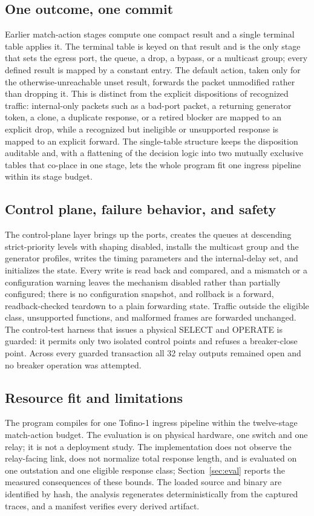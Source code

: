 \documentclass[conference]{IEEEtran}
\begin{document}
\subsection{One outcome, one commit}
Earlier match-action stages compute one compact result and a single terminal table applies it. The
terminal table is keyed on that result and is the only stage that sets the egress port, the queue, a
drop, a bypass, or a multicast group; every defined result is mapped by a constant entry. The default
action, taken only for the otherwise-unreachable unset result, forwards the packet unmodified rather
than dropping it. This is distinct from the explicit dispositions of recognized traffic: internal-only
packets such as a bad-port packet, a returning generator token, a clone, a duplicate response, or a
retired blocker are mapped to an explicit drop, while a recognized but ineligible or unsupported
response is mapped to an explicit forward. The single-table structure keeps the disposition auditable
and, with a flattening of the decision logic into two mutually exclusive tables that co-place in one
stage, lets the whole program fit one ingress pipeline within its stage budget.

\subsection{Control plane, failure behavior, and safety}
The control-plane layer brings up the ports, creates the queues at descending strict-priority levels
with shaping disabled, installs the multicast group and the generator profiles, writes the timing
parameters and the internal-delay set, and initializes the state. Every write is read back and
compared, and a mismatch or a configuration warning leaves the mechanism disabled rather than
partially configured; there is no configuration snapshot, and rollback is a forward, readback-checked
teardown to a plain forwarding state. Traffic outside the eligible class, unsupported functions, and
malformed frames are forwarded unchanged. The control-test harness that issues a physical SELECT and
OPERATE is guarded: it permits only two isolated control points and refuses a breaker-close point.
Across every guarded transaction all 32 relay outputs remained open and no breaker operation was
attempted.

\subsection{Resource fit and limitations}
The program compiles for one Tofino-1 ingress pipeline within the twelve-stage match-action budget.
The evaluation is on physical hardware, one switch and one relay; it is not a deployment study. The
implementation does not observe the relay-facing link, does not normalize total response length, and
is evaluated on one outstation and one eligible response class; Section~\ref{sec:eval} reports the
measured consequences of these bounds. The loaded source and binary are identified by hash, the
analysis regenerates deterministically from the captured traces, and a manifest verifies every derived
artifact.
\end{document}

